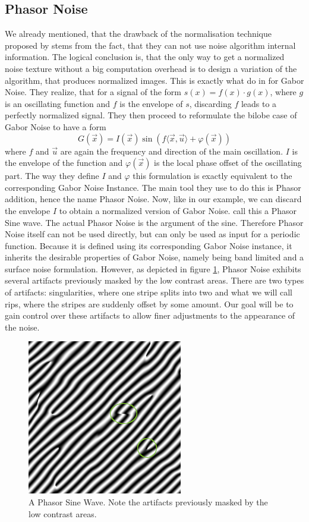 \documentclass{utue} %
\begin{document}
\subsection{Phasor Noise}\label{sec:phasorNoise}
We already mentioned, that the drawback of the normalisation technique proposed by \citeauthor{spectrumOfVariance} stems from the fact, that they can not use noise algorithm internal information. The logical conclusion is, that the only way to get a normalized noise texture without a big computation overhead is to design a variation of the algorithm, that produces normalized images. This is exactly what \citeauthor{phasorNoise} do in \cite{phasorNoise} for Gabor Noise. They realize, that for a signal of the form $s(x) = f(x)\cdot g(x)$, where $g$ is an oscillating function and $f$ is the envelope of $s$, discarding $f$ leads to a perfectly normalized signal. They then proceed to reformulate the bilobe case of Gabor Noise to have a form
$$
G(\vec{x}) = I(\vec{x})\sin{(f\langle\vec{x},\vec{u}\rangle + \varphi(\vec{x}))}
$$
where $f$ and $\vec{u}$ are again the frequency and direction of the main oscillation. $I$ is the envelope of the function and $\varphi(\vec{x})$ is the local phase offset of the oscillating part. The way they define $I$ and $\varphi$ this formulation is exactly equivalent to the corresponding Gabor Noise Instance. The main tool they use to do this is Phasor addition, hence the name Phasor Noise. Now, like in our example, we can discard the envelope $I$ to obtain a normalized version of Gabor Noise. \citeauthor{phasorNoise} call this a Phasor Sine wave. The actual Phasor Noise is the argument of the sine. Therefore Phasor Noise itself can not be used directly, but can only be used as input for a periodic function. Because it is defined using its corresponding Gabor Noise instance, it inherits the desirable properties of Gabor Noise, namely being band limited and a surface noise formulation. However, as depicted in figure \ref{fig:phasorNoise}, Phasor Noise exhibits several artifacts previously masked by the low contrast areas. There are two types of artifacts: singularities, where one stripe splits into two and what we will call rips, where the stripes are suddenly offset by some amount. Our goal will be to gain control over these artifacts to allow finer adjustments to the appearance of the noise.

\begin{figure}[h]
  \centering
  \includegraphics[width = 0.45\linewidth]{images/phasorSineWave}
  \caption{A Phasor Sine Wave. Note the artifacts previously masked by the low contrast areas.}\label{fig:phasorNoise}
\end{figure}
\end{document}

